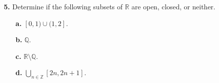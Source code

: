 \documentclass[ 12pt ]{article}
\begin{document}
\begin{enumerate}
		\begin{proof}
			Suppose $\widetilde{d} : \mathbb{R}^n \times \mathbb{R}^n$ is defined as stated above.
			\begin{enumerate}
				\item[\textbf{a.}] For the following, assume that $\textbf{x}, \textbf{y}, \textbf{z} \in \mathbb{R}^n$ are arbitrary points. Clearly we can see that $\widetilde{d}(
					\textbf{x}, \textbf{y} ) \geq 0$ with equality if and only if $\textbf{x} = \textbf{y}$. Additionally, it is obvious that $\widetilde{d}( \textbf{x}, \textbf{y} ) =
					\widetilde{d}( \textbf{y}, \textbf{x} )$. In regard to transitivity, consider two cases concerning the equality $\textbf{x} = \textbf{z}$. If $\textbf{x} =
					\textbf{z}$, then $$\widetilde{d}( \textbf{x}, \textbf{z} ) = 0 \leq \widetilde{d}( \textbf{x}, \textbf{y} ) + \widetilde{d}( \textbf{y}, \textbf{z} )$$ with
					equality if and only if $\textbf{x} = \textbf{y} = \textbf{z}$. Otherwise, if $\textbf{x} \neq \textbf{z}$, then $$\widetilde{d}( \textbf{x}, \textbf{z} ) = 1 \leq
					\widetilde{d}( \textbf{x}, \textbf{y} ) + \widetilde{d}( \textbf{y}, \textbf{z} )$$ since it cannot hold that $\textbf{x} = \textbf{y} = \textbf{z}$. Thus,
					$\widetilde{d}$ is a metric on $\textbf{R}^n$ by definition.

				\item[\textbf{b.}] Suppose there exists a norm $||\cdot|| : \mathbb{R}^n \to [0, \infty)$ on $\mathbb{R}^n$ such that $\widetilde{d}(\textbf{x}, \textbf{y}) = ||
					\textbf{x} - \textbf{y}||$ for all $\textbf{x}, \textbf{y} \in \mathbb{R}^n$. Then it follows that $$\widetilde{d}(r\textbf{x}, r\textbf{y}) = ||r\textbf{x} -
					r\textbf{y}|| = r||\textbf{x} - \textbf{y}|| = r\widetilde{d}(\textbf{x}, \textbf{y})$$ for all $r \in \mathbb{R}$; however, for $r > 1$ and $\textbf{x} \neq
					\textbf{y}$, $$\widetilde{d}(r\textbf{x}, r\textbf{y}) = r \notin \{ 0, 1 \} = \widetilde{d}(\mathbb{R}^n \times \mathbb{R}^n),$$ a contradiction.
			\end{enumerate}
		\end{proof}


	\item[\textbf{5.}] Determine if the following subsets of $\mathbb{R}$ are open, closed, or neither.
		\begin{enumerate}
			\item[\textbf{a.}] $[0, 1) \cup (1, 2]$.
			\item[\textbf{b.}] $\mathbb{Q}$.
			\item[\textbf{c.}] $\mathbb{R} \setminus \mathbb{Q}$.
			\item[\textbf{d.}] $\bigcup_{n \in \mathbb{Z}} [2n, 2n+1]$.
		\end{enumerate}


\end{enumerate}
\end{document}
